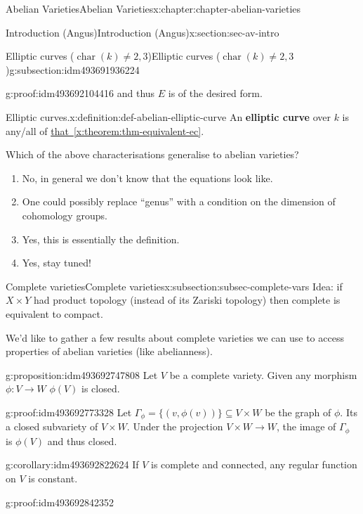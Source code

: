 \documentclass[oneside,10pt,]{book}
\newcommand{\terminology}[1]{\textbf{#1}}
\numberwithin{equation}{section}
\DeclareMathOperator{\characteristic}{char}
\begin{document}
\begin{chapterptx}{Abelian Varieties}{}{Abelian Varieties}{}{}{x:chapter:chapter-abelian-varieties}
\begin{sectionptx}{Introduction (Angus)}{}{Introduction (Angus)}{}{}{x:section:sec-av-intro}
\begin{subsectionptx}{Elliptic curves (\(\characteristic(k) \ne 2,3\))}{}{Elliptic curves (\(\characteristic(k) \ne 2,3\))}{}{}{g:subsection:idm493691936224}
\begin{proofptx}{}{g:proof:idm493692104416}
and thus \(E\) is of the desired form.%
\end{proofptx}
\begin{definition}{Elliptic curves.}{x:definition:def-abelian-elliptic-curve}%
An \terminology{elliptic curve} over \(k\) is any\slash{}all of \hyperref[x:theorem:thm-equivalent-ec]{that~\ref{x:theorem:thm-equivalent-ec}}.%
\end{definition}
Which of the above characterisations generalise to abelian varieties?%
\begin{enumerate}
\item{}No, in general we don't know that the equations look like.%
\item{}One could possibly replace ``genus'' with a condition on the dimension of cohomology groups.%
\item{}Yes, this is essentially the definition.%
\item{}Yes, stay tuned!%
\end{enumerate}
%
\end{subsectionptx}
%
%
\typeout{************************************************}
\typeout{************************************************}
%
\begin{subsectionptx}{Complete varieties}{}{Complete varieties}{}{}{x:subsection:subsec-complete-vars}
Idea: if \(X \times Y\) had product topology (instead of its Zariski topology) then complete is equivalent to compact.%
\par
We'd like to gather a few results about complete varieties we can use to access properties of abelian varieties (like abelianness).%
\begin{proposition}{}{}{g:proposition:idm493692747808}%
Let \(V\) be a complete variety. Given any morphism \(\phi\colon V \to W\) \(\phi (V) \) is closed.%
\end{proposition}
\begin{proofptx}{}{g:proof:idm493692773328}
Let \(\Gamma_\phi = \{(v, \phi(v))\} \subseteq V\times W\) be the graph of \(\phi\). Its a closed subvariety of \(V\times W\). Under the projection \(V\times W \to W\), the image of \(\Gamma_\phi\) is \(\phi(V)\) and thus closed.%
\end{proofptx}
\begin{corollary}{}{}{g:corollary:idm493692822624}%
If \(V\) is complete and connected, any regular function on \(V\) is constant.%
\end{corollary}
\begin{proofptx}{}{g:proof:idm493692842352}

\end{proofptx}
\end{subsectionptx}
\end{sectionptx}
\end{chapterptx}
\end{document}
